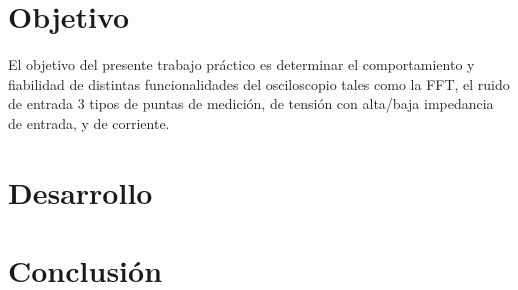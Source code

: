 \documentclass[a4paper,10pt]{article}
\title{  }
\begin{document}
	\maketitle %
	\newpage

	\tableofcontents %
	\newpage


	\section{Objetivo}
	
	\indent	El objetivo del presente trabajo práctico es determinar el comportamiento y fiabilidad de distintas funcionalidades del osciloscopio tales como la FFT, el ruido de entrada 3 tipos de puntas de medición, de tensión con alta/baja impedancia de entrada, y de corriente.
	
	\newpage
	\section{Desarrollo}
	\newpage 
	\section{Conclusión}
	\indent
	\indent  
\end{document}
